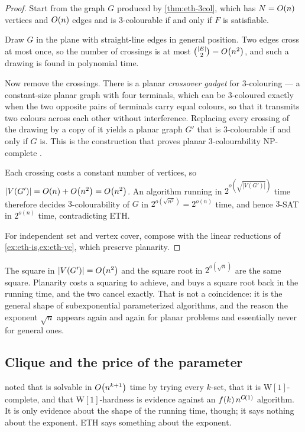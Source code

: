 \begin{proof}
Start from the graph $G$ produced by \cref{thm:eth-3col}, which has
$N = O\!\left(n\right)$ vertices and $O\!\left(n\right)$ edges and is $3$-colourable if and only
if $F$ is satisfiable.

Draw $G$ in the plane with straight-line edges in general position. Two edges
cross at most once, so the number of crossings is at most
$\binom{|E|}{2} = O\!\left(n^2\right)$, and such a drawing is found in polynomial
time.

Now remove the crossings. There is a planar \emph{crossover gadget} for
$3$-colouring --- a constant-size planar graph with four terminals, which can be
$3$-coloured exactly when the two opposite pairs of terminals carry equal
colours, so that it transmits two colours across each other without
interference. Replacing every crossing of the drawing by a copy of it yields a
planar graph $G'$ that is $3$-colourable if and only if $G$ is. This is the
construction that proves planar $3$-colourability \textrm{NP}-complete
\citep{GareyJohnsonStockmeyer1976}.

Each crossing costs a constant number of vertices, so
$|V(G')| = O\!\left(n\right) + O\!\left(n^2\right) = O\!\left(n^2\right)$. An algorithm running in
$2^{o(\sqrt{|V(G')|})}$ time therefore decides $3$-colourability of $G$ in
$2^{o(\sqrt{n^2})} = 2^{o(n)}$ time, and hence $3$-SAT in $2^{o(n)}$ time,
contradicting ETH.

For independent set and vertex cover, compose with the linear reductions of
\cref{ex:eth-is,ex:eth-vc}, which preserve planarity.
\end{proof}

\begin{intuition}
The square in $|V(G')| = O\!\left(n^2\right)$ and the square root in $2^{o(\sqrt n)}$
are the same square. Planarity costs a squaring to achieve, and buys a square
root back in the running time, and the two cancel exactly. That is not a
coincidence: it is the general shape of subexponential parameterized
algorithms, and the reason the exponent $\sqrt n$ appears again and again for
planar problems and essentially never for general ones.
\end{intuition}

\subsection{Clique and the price of the parameter}

 noted that  is solvable in $O\!\left(n^{k+1}\right)$ time
by trying every $k$-set, that it is $\mathrm{W}[1]$-complete, and that
$\mathrm{W}[1]$-hardness is evidence against an $f(k)\,n^{O\!\left(1\right)}$
algorithm. It is only evidence about the shape of the running time, though; it
says nothing about the exponent. ETH says something about the exponent.

